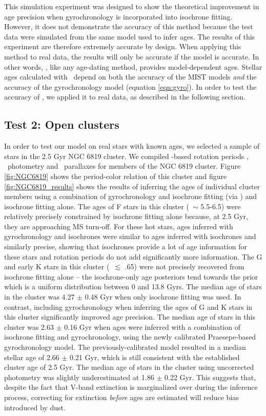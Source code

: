 This simulation experiment was designed to show the theoretical improvement in
age precision when gyrochronology is incorporated into isochrone fitting.
However, it does not demonstrate the accuracy of this method because the test
data were simulated from the same model used to infer ages.
The results of this experiment are therefore extremely accurate by design.
When applying this method to real data, the results will only be accurate if
the model is accurate.
In other words, \sd, like any age-dating method, provides model-dependent
ages.
Stellar ages calculated with \sd\ depend on both the accuracy of the MIST
models {\it and} the accuracy of the gyrochronology model (equation
\ref{eqn:gyro}).
In order to test the accuracy of \sd, we applied it to real data, as described
in the following section.

\subsection{Test 2: Open clusters}
In order to test our model on real stars with known ages, we selected a sample
of stars in the 2.5 Gyr NGC 6819 cluster.
We compiled \kepler-based rotation periods \citep{meibom2015}, \Gaia\
photometry and \gaia\ parallaxes for members of the NGC 6819 cluster.
Figure \ref{fig:NGC6819} shows the period-color relation of this
cluster and figure \ref{fig:NGC6819_results} shows the results of inferring
the ages of individual cluster members using a combination of gyrochronology
and isochrone fitting (via \sd) and isochrone fitting alone.
The ages of F stars in this cluster (\gcolor\ $\sim$ 5.5-6.5) were relatively
precisely constrained by isochrone fitting alone because, at 2.5 Gyr, they are
approaching MS turn-off.
For these hot stars, ages inferred with gyrochronology and isochrones were
similar to ages inferred with isochrones and similarly precise, showing that
isochrones provide a lot of age information for these stars and rotation
periods do not add significantly more information.
The G and early K stars in this cluster (\gcolor\ $\lesssim$ .65) were not
precisely recovered from isochrone fitting alone -- the isochrone-only age
posteriors tend towards the prior which is a uniform distribution between 0
and 13.8 Gyrs.
The median age of stars in the cluster was 4.27 $\pm$ 0.48 Gyr when only
isochrone fitting was used.
In contrast, including gyrochronology when inferring the ages of G and K stars
in this cluster significantly improved age precision.
The median age of stars in this cluster was 2.63 $\pm$ 0.16 Gyr when ages were
inferred with a combination of isochrone fitting and gyrochronology, using the
newly calibrated Praesepe-based gyrochronology model.
The previously-calibrated \citet{angus2015} model resulted in a median stellar
age of 2.66 $\pm$ 0.21 Gyr, which is still consistent with the established
cluster age of 2.5 Gyr.
The median age of stars in the cluster using uncorrected photometry was
slightly underestimated at 1.86 $\pm$ 0.22 Gyr.
This suggests that, despite the fact that V-band extinction is marginalized
over during the inference process, correcting for extinction {\it before} ages
are estimated will reduce bias introduced by dust.

